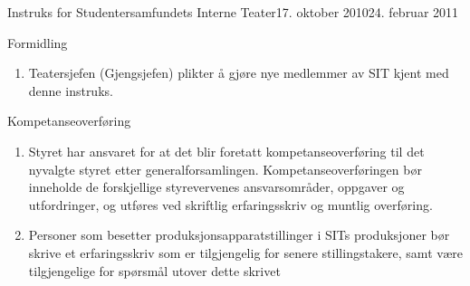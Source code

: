 \begin{instruks}{Instruks for Studentersamfundets Interne Teater}{17. oktober 2010}{24. februar 2011 }
	\begin{instruksledd}{Formidling}
		\begin{enumerate}
			\item Teatersjefen (Gjengsjefen) plikter å gjøre nye medlemmer av SIT kjent med
				denne instruks.
		\end{enumerate}
	\end{instruksledd}

	\begin{instruksledd}{Kompetanseoverføring}
		\begin{enumerate}
			\item Styret har ansvaret for at det blir foretatt kompetanseoverføring til det
				nyvalgte styret etter generalforsamlingen. Kompetanseoverføringen bør inneholde de forskjellige
				styrevervenes ansvarsområder, oppgaver og utfordringer, og utføres ved skriftlig erfaringsskriv og
				muntlig overføring.
			\item Personer som besetter produksjonsapparatstillinger i SITs produksjoner bør
				skrive et erfaringsskriv som er tilgjengelig for senere stillingstakere, samt være tilgjengelige for
				spørsmål utover dette skrivet	
		\end{enumerate}
	\end{instruksledd}


\end{instruks}


